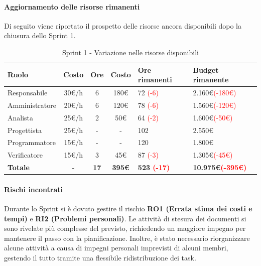 \documentclass[a4paper,12pt]{article}
\begin{document}
\paragraph{Aggiornamento delle risorse rimanenti}
Di seguito viene riportato il prospetto delle risorse ancora disponibili dopo la chiusura dello Sprint 1.

\begin{table}[H]
    \centering
    \renewcommand{\arraystretch}{1.5}
    \begin{tabularx}{\textwidth}{|l|c|c|c|X|X|}
        \hline
        \rowcolor{tableHeader}
        \textbf{Ruolo} & \textbf{Costo} & \textbf{Ore} & \textbf{Costo} & \textbf{Ore rimanenti} & \textbf{Budget rimanente} \\
        \hline
        \rowcolor{tableLineOdd}
        Responsabile & 30\euro/h & 6 & 180\euro & 72 \textcolor{red}{(-6)} & 2.160\euro \textcolor{red}{(-180\euro)} \\
        \hline
        \rowcolor{tableLineEven}
        Amministratore & 20\euro/h & 6 & 120\euro & 78 \textcolor{red}{(-6)} & 1.560\euro \textcolor{red}{(-120\euro)} \\
        \hline
        \rowcolor{tableLineOdd}
        Analista & 25\euro/h & 2 & 50\euro & 64 \textcolor{red}{(-2)} & 1.600\euro \textcolor{red}{(-50\euro)} \\
        \hline
        \rowcolor{tableLineEven}
        Progettista & 25\euro/h & - & - & 102 & 2.550\euro \\
        \hline
        \rowcolor{tableLineOdd}
        Programmatore & 15\euro/h & - & - & 120 & 1.800\euro \\
        \hline
        \rowcolor{tableLineEven}
        Verificatore & 15\euro/h & 3 & 45\euro & 87 \textcolor{red}{(-3)} & 1.305\euro \textcolor{red}{(-45\euro)} \\
        \hline
        \rowcolor{tableHeader}
        \textbf{Totale} & - & \textbf{17} & \textbf{395\euro} & \textbf{523 \textcolor{red}{(-17)}} & \textbf{10.975\euro \textcolor{red}{(-395\euro)}} \\
        \hline
    \end{tabularx}
    \caption{Sprint 1 - Variazione nelle risorse disponibili}
\end{table}

\paragraph{Rischi incontrati}
Durante lo Sprint si è dovuto gestire il rischio \textbf{RO1 (Errata stima dei costi e tempi)} e \textbf{RI2 (Problemi personali)}. Le attività di stesura dei documenti si sono rivelate più complesse del previsto, richiedendo un maggiore impegno per mantenere il passo con la pianificazione. Inoltre, è stato necessario riorganizzare alcune attività a causa di impegni personali imprevisti di alcuni membri, gestendo il tutto tramite una flessibile ridistribuzione dei task.
\end{document}
